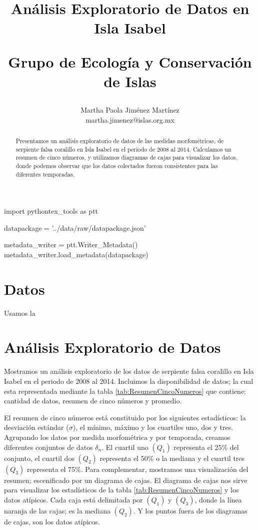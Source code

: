 \documentclass{article}
\begin{document}
 

\begin{pycode}
import pythontex_tools as ptt

datapackage = '../data/raw/datapackage.json'

metadata_writer = ptt.Writer_Metadata() 
metadata_writer.load_metadata(datapackage)

\end{pycode}

\author{Martha Paola Jiménez Martínez \\ 
\small{martha.jimenez@islas.org.mx}} \title{Análisis Exploratorio de Datos en Isla Isabel \\
\begin{large} Grupo de Ecología y Conservación de Islas \end{large}}  

\maketitle

\begin{abstract}
Presentamos un análisis exploratorio de datos de las medidas morfométricas, de serpiente falsa
coralillo en Isla  Isabel en el periodo de 2008 al 2014. Calculamos un resumen de cinco números, y
utilizamos diagramas de cajas para visualizar los datos, donde podemos observar que los datos
colectados fueron consistentes para las diferentes temporadas.
\end{abstract}

\section*{Datos}
Usamos la 

\section*{Análisis Exploratorio de Datos}
Mostramos un análisis exploratorio de los datos de serpiente falsa coralillo en Isla Isabel en el
periodo de 2008 al 2014. Incluimos la disponibilidad de datos; la cual esta representada mediante la
tabla \ref{tab:ResumenCincoNumeros} que contiene: cantidad de datos, resumen de cinco números y
promedio.

El resumen de cinco números está constituido por los siguientes estadísticos: la desviación estándar
($\sigma$), el mínimo, máximo y los cuartiles uno, dos y tres. Agrupando los datos por medida
morfométrica y por temporada, creamos diferentes conjuntos de datos $\delta_n$. El cuartil uno
$(Q_1)$ representa el 25\% del conjunto, el cuartil dos $(Q_2)$ representa el 50\% o la mediana y el
cuartil tres $(Q_3)$ representa el 75\%.  Para complementar, mostramos una visualización del
resumen; escenificado por un diagrama de cajas.  El diagrama de cajas nos sirve para visualizar los
estadísticos de la tabla \ref{tab:ResumenCincoNumeros} y los datos atípicos.  Cada caja está
delimitada por $(Q_1)$ y $(Q_3)$, donde la línea naranja de las cajas; es la mediana $(Q_2)$. Y los
puntos fuera de los diagramas de cajas, son los datos atípicos.
\end{document}
